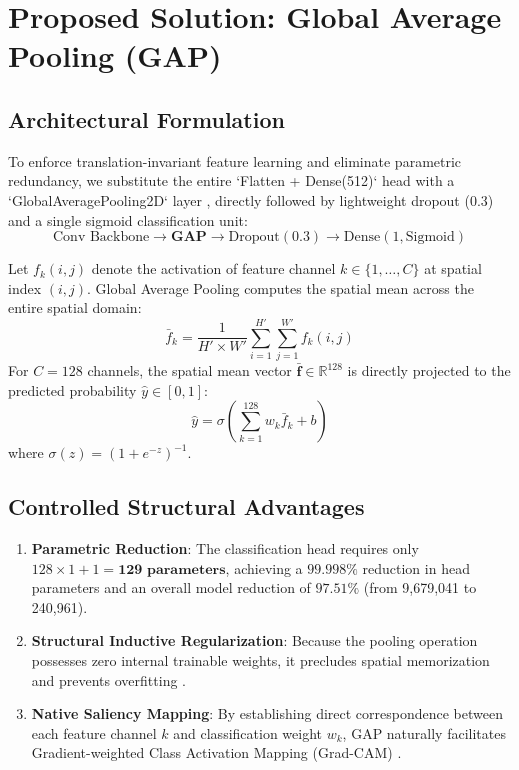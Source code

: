 \documentclass[conference]{IEEEtran}
\begin{document}
\section{Proposed Solution: Global Average Pooling (GAP)}
\subsection{Architectural Formulation}
To enforce translation-invariant feature learning and eliminate parametric redundancy, we substitute the entire `Flatten + Dense(512)` head with a `GlobalAveragePooling2D` layer \cite{b_lin}, directly followed by lightweight dropout (0.3) and a single sigmoid classification unit:
$$\text{Conv Backbone} \to \mathbf{GAP} \to \text{Dropout}(0.3) \to \text{Dense}(1, \text{Sigmoid})$$

Let $f_k(i, j)$ denote the activation of feature channel $k \in \{1, \dots, C\}$ at spatial index $(i, j)$. Global Average Pooling computes the spatial mean across the entire spatial domain:
\begin{equation}
\bar{f}_k = \frac{1}{H' \times W'} \sum_{i=1}^{H'} \sum_{j=1}^{W'} f_k(i, j)
\label{eq_gap}
\end{equation}
For $C = 128$ channels, the spatial mean vector $\mathbf{\bar{f}} \in \mathbb{R}^{128}$ is directly projected to the predicted probability $\hat{y} \in [0, 1]$:
\begin{equation}
\hat{y} = \sigma \left( \sum_{k=1}^{128} w_k \bar{f}_k + b \right)
\label{eq_pred}
\end{equation}
where $\sigma(z) = (1 + e^{-z})^{-1}$.

\subsection{Controlled Structural Advantages}
\begin{enumerate}
    \item \textbf{Parametric Reduction}: The classification head requires only $128 \times 1 + 1 = \mathbf{129\text{ parameters}}$, achieving a $\mathbf{99.998\%}$ reduction in head parameters and an overall model reduction of $\mathbf{97.51\%}$ (from 9,679,041 to 240,961).
    \item \textbf{Structural Inductive Regularization}: Because the pooling operation possesses zero internal trainable weights, it precludes spatial memorization and prevents overfitting \cite{b_lin}.
    \item \textbf{Native Saliency Mapping}: By establishing direct correspondence between each feature channel $k$ and classification weight $w_k$, GAP naturally facilitates Gradient-weighted Class Activation Mapping (Grad-CAM) \cite{b_selvaraju}.
\end{enumerate}
\end{document}
